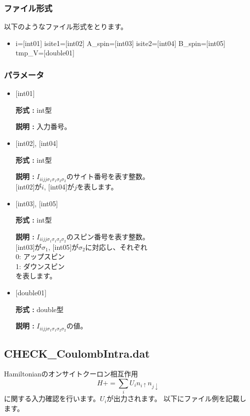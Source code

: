 \subsubsection{ファイル形式}
以下のようなファイル形式をとります。
 \begin{itemize}
   \item  i=$[$int01$]$ isite1=$[$int02$]$  A\_spin=$[$int03$]$ isite2=$[$int04$]$  B\_spin=$[$int05$]$ tmp\_V=$[$double01$]$ 
 \end{itemize}
 
\subsubsection{パラメータ}
 \begin{itemize}

    \item  $[$int01$]$ 
   
    {\bf 形式 :} int型

   {\bf 説明 :} 入力番号。
      
   \item  $[$int02$]$, $[$int04$]$
   
    {\bf 形式 :} int型

    {\bf 説明 :}   $I_{iijj\sigma_1\sigma_1\sigma_2\sigma_2}$のサイト番号を表す整数。 \\
    $[$int02$]$が$i$, $[$int04$]$が$j$を表します。
 
   \item  $[$int03$]$, $[$int05$]$  
   
    {\bf 形式 :} int型

   {\bf 説明 :}  $I_{iijj\sigma_1\sigma_1\sigma_2\sigma_2}$のスピン番号を表す整数。\\
   $[$int03$]$が$\sigma_1$, $[$int05$]$が$\sigma_2$に対応し、それぞれ\\
0: アップスピン\\
1: ダウンスピン\\
を表します。
 
   \item  $[$double01$]$ 
   
    {\bf 形式 :} double型

   {\bf 説明 :} $I_{iijj\sigma_1\sigma_1\sigma_2\sigma_2}$の値。
  
\end{itemize}

\newpage
\subsection{CHECK\_CoulombIntra.dat}
Hamiltonianのオンサイトクーロン相互作用
\begin{equation}
H+=\sum_{i} U_i n_{i\uparrow} n_{j \downarrow}
\end{equation}
に関する入力確認を行います。$U_i$が出力されます。
以下にファイル例を記載します。

